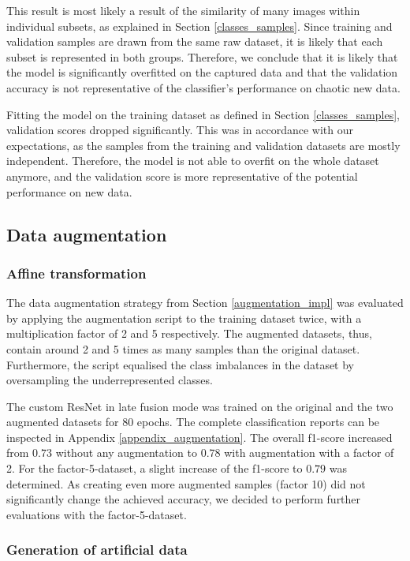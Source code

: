 \documentclass{l4proj}
\begin{document}
This result is most likely a result of the similarity of many images within individual subsets, as explained in Section \ref{classes_samples}. Since training and validation samples are drawn from the same raw dataset, it is likely that each subset is represented in both groups. Therefore, we conclude that it is likely that the model is significantly overfitted on the captured data and that the validation accuracy is not representative of the classifier's performance on chaotic new data. 

Fitting the model on the training dataset as defined in Section \ref{classes_samples}, validation scores dropped significantly. This was in accordance with our expectations, as the samples from the training and validation datasets are mostly independent. Therefore, the model is not able to overfit on the whole dataset anymore, and the validation score is more representative of the potential performance on new data.

\subsection{Data augmentation}

\subsubsection{Affine transformation}

The data augmentation strategy from Section \ref{augmentation_impl} was evaluated by applying the augmentation script to the training dataset twice, with a multiplication factor of 2 and 5 respectively. The augmented datasets, thus, contain around 2 and 5 times as many samples than the original dataset. Furthermore, the script equalised the class imbalances in the dataset by oversampling the underrepresented classes.

The custom ResNet in late fusion mode was trained on the original and the two augmented datasets for 80 epochs. The complete classification reports can be inspected in Appendix \ref{appendix_augmentation}. The overall f1-score increased from $0.73$ without any augmentation to $0.78$ with augmentation with a factor of 2. For the factor-5-dataset, a slight increase of the f1-score to $0.79$ was determined. As creating even more augmented samples (factor 10) did not significantly change the achieved accuracy, we decided to perform further evaluations with the factor-5-dataset.

\subsubsection{Generation of artificial data}
\label{eval_autoencoder}
\end{document}
